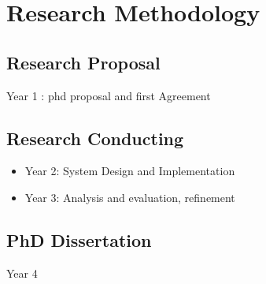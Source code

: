 \section{Research Methodology}

\subsection{Research Proposal}
Year 1 : phd proposal and first Agreement

\subsection{Research Conducting}
\begin{itemize}
\item Year 2: System Design and Implementation
\item Year 3: Analysis and evaluation, refinement
\end{itemize}


\subsection{PhD Dissertation}
Year 4
  